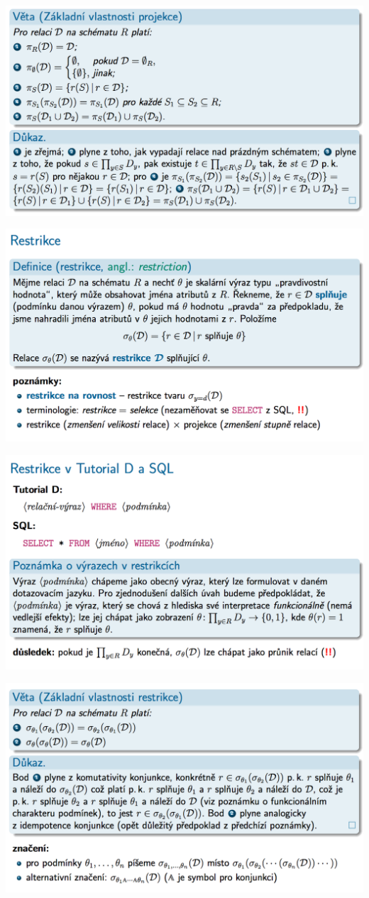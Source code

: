 \documentclass[10pt,a4paper]{article}
\begin{document}
	\includegraphics[scale=0.4]{img/31}
	
	\includegraphics[scale=0.4]{img/32}
	
	\includegraphics[scale=0.4]{img/33}
	
	\includegraphics[scale=0.4]{img/34}
	
\end{document}
